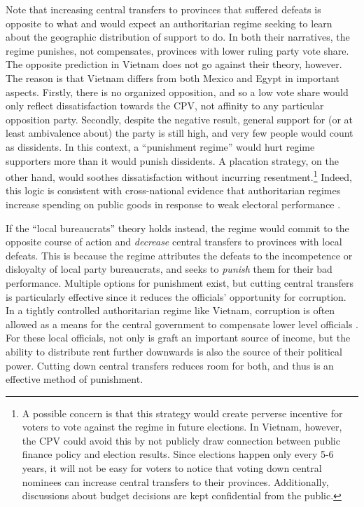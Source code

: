 \documentclass[12pt]{article}\usepackage[]{graphicx}\usepackage[]{color}
\newcommand{\1}{\mathbbm{1}}
\begin{document}
Note that increasing central transfers to provinces that suffered defeats is opposite to what \cite{Magaloni2006} and \cite{Blaydes2008} would expect an authoritarian regime seeking to learn about the geographic distribution of support to do. In both their narratives, the regime punishes, not compensates, provinces with lower ruling party vote share. The opposite prediction in Vietnam does not go against their theory, however. The reason is that Vietnam differs from both Mexico and Egypt in important aspects. Firstly, there is no organized opposition, and so a low vote share would only reflect dissatisfaction towards the CPV, not affinity to any particular opposition party. Secondly, despite the negative result, general support for (or at least ambivalence about) the party is still high, and very few people would count as dissidents. In this context, a ``punishment regime'' would hurt regime supporters more than it would punish dissidents. A  placation strategy, on the other hand, would soothes dissatisfaction without incurring resentment.\footnote{A possible concern is that this strategy would create perverse incentive for voters to vote against the regime in future elections. In Vietnam, however, the CPV could avoid this by not publicly draw connection between public finance policy and election results. Since elections happen only every 5-6 years, it will not be easy for voters to notice that voting down central nominees can increase central transfers to their provinces. Additionally, discussions about budget decisions are kept confidential from the public.} Indeed, this logic is consistent with cross-national evidence that authoritarian regimes increase spending on public goods in response to weak electoral performance \citep{Miller2015}.

If the ``local bureaucrats'' theory holds instead, the regime would commit to the opposite course of action and \textit{decrease} central transfers to provinces with local defeats. This is because the regime attributes the defeats to the incompetence or disloyalty of local party bureaucrats, and seeks to \textit{punish} them for their bad performance. Multiple options for punishment exist, but cutting central transfers is particularly effective since it reduces the officials' opportunity for corruption. In a tightly controlled authoritarian regime like Vietnam, corruption is often allowed as a means for the central government to compensate lower level officials \citep{Darden2008}. For these local officials, not only is graft an important source of income, but the ability to distribute rent further downwards is also the source of their political power. Cutting down central transfers reduces room for both, and thus is an effective method of punishment.
\end{document}
